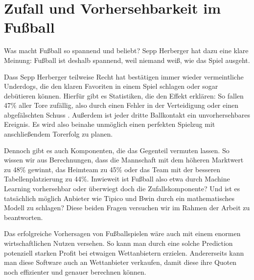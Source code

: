 \chapter{Zufall und Vorhersehbarkeit im Fußball}
	
Was macht Fußball so spannend und beliebt? Sepp Herberger hat dazu eine klare Meinung:
\glqq Fußball ist deshalb spannend, weil niemand weiß, wie das Spiel ausgeht.\grqq 

Dass Sepp Herberger teilweise Recht hat bestätigen immer wieder vermeintliche Underdogs, die den klaren Favoriten in einem Spiel schlagen oder sogar debütieren können. Hierfür gibt es Statistiken, die den Effekt erklären: So fallen 47\% aller Tore zufällig, also durch einen Fehler in der Verteidigung oder einen abgefälschten Schuss \autocite[Vgl.][]{.06102018}. Außerdem ist jeder dritte Ballkontakt ein unvorhersehbares Ereignis. Es wird also beinahe unmöglich einen perfekten Spielzug mit anschließendem Torerfolg zu planen. \autocite[Vgl.][]{.}

Dennoch gibt es auch Komponenten, die das Gegenteil vermuten lassen.
So wissen wir aus Berechnungen, dass die Mannschaft mit dem höheren Marktwert zu 48\% gewinnt, das Heimteam zu 45\% oder das Team mit der besseren Tabellenplatzierung zu 44\%. 
Inwieweit ist Fußball also etwa durch Machine Learning vorhersehbar oder überwiegt doch die Zufallskomponente? Und ist es tatsächlich möglich Anbieter wie Tipico und Bwin durch ein mathematisches Modell zu schlagen? Diese beiden Fragen versuchen wir im Rahmen der Arbeit zu beantworten.

Das erfolgreiche Vorhersagen von Fußballspielen wäre auch mit einem enormen wirtschaftlichen Nutzen versehen. So kann man durch eine solche Prediction potenziell starken Profit bei etwaigen Wettanbietern erzielen. Andererseits kann man diese Software auch an Wettanbieter verkaufen, damit diese ihre Quoten noch effizienter und genauer berechnen können.


